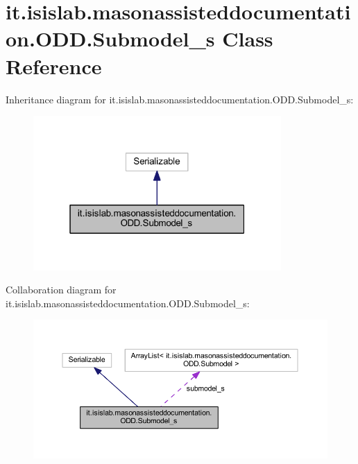 \hypertarget{classit_1_1isislab_1_1masonassisteddocumentation_1_1_o_d_d_1_1_submodel__s}{\section{it.\-isislab.\-masonassisteddocumentation.\-O\-D\-D.\-Submodel\-\_\-s Class Reference}
\label{classit_1_1isislab_1_1masonassisteddocumentation_1_1_o_d_d_1_1_submodel__s}
}


Inheritance diagram for it.\-isislab.\-masonassisteddocumentation.\-O\-D\-D.\-Submodel\-\_\-s\-:\nopagebreak
\begin{figure}[H]
\begin{center}
\leavevmode
\includegraphics[width=268pt]{classit_1_1isislab_1_1masonassisteddocumentation_1_1_o_d_d_1_1_submodel__s__inherit__graph}
\end{center}
\end{figure}


Collaboration diagram for it.\-isislab.\-masonassisteddocumentation.\-O\-D\-D.\-Submodel\-\_\-s\-:\nopagebreak
\begin{figure}[H]
\begin{center}
\leavevmode
\includegraphics[width=350pt]{classit_1_1isislab_1_1masonassisteddocumentation_1_1_o_d_d_1_1_submodel__s__coll__graph}
\end{center}
\end{figure}
